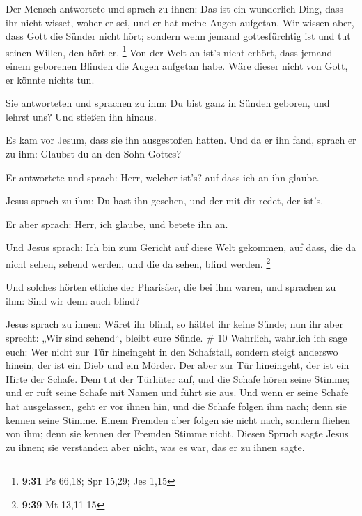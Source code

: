  Der Mensch antwortete und sprach zu ihnen: Das ist ein
wunderlich Ding, dass ihr nicht wisset, woher er sei, und er hat meine
Augen aufgetan.  Wir wissen aber, dass Gott die Sünder
nicht hört; sondern wenn jemand gottesfürchtig ist und tut seinen
Willen, den hört er. \footnote{\textbf{9:31} Ps 66,18; Spr 15,29; Jes
  1,15}  Von der Welt an ist's nicht erhört, dass jemand
einem geborenen Blinden die Augen aufgetan habe.  Wäre
dieser nicht von Gott, er könnte nichts tun.

 Sie antworteten und sprachen zu ihm: Du bist ganz in
Sünden geboren, und lehrst uns? Und stießen ihn hinaus.

 Es kam vor Jesum, dass sie ihn ausgestoßen hatten. Und
da er ihn fand, sprach er zu ihm: Glaubst du an den Sohn Gottes?

 Er antwortete und sprach: Herr, welcher ist's? auf dass
ich an ihn glaube.

 Jesus sprach zu ihm: Du hast ihn gesehen, und der mit
dir redet, der ist's.

 Er aber sprach: Herr, ich glaube, und betete ihn an.

 Und Jesus sprach: Ich bin zum Gericht auf diese Welt
gekommen, auf dass, die da nicht sehen, sehend werden, und die da sehen,
blind werden. \footnote{\textbf{9:39} Mt 13,11-15}

 Und solches hörten etliche der Pharisäer, die bei ihm
waren, und sprachen zu ihm: Sind wir denn auch blind?

 Jesus sprach zu ihnen: Wäret ihr blind, so hättet ihr
keine Sünde; nun ihr aber sprecht: „Wir sind sehend``, bleibt eure
Sünde. \# 10  Wahrlich, wahrlich ich sage euch: Wer nicht
zur Tür hineingeht in den Schafstall, sondern steigt anderswo hinein,
der ist ein Dieb und ein Mörder.  Der aber zur Tür
hineingeht, der ist ein Hirte der Schafe.  Dem tut der
Türhüter auf, und die Schafe hören seine Stimme; und er ruft seine
Schafe mit Namen und führt sie aus.  Und wenn er seine
Schafe hat ausgelassen, geht er vor ihnen hin, und die Schafe folgen ihm
nach; denn sie kennen seine Stimme.  Einem Fremden aber
folgen sie nicht nach, sondern fliehen von ihm; denn sie kennen der
Fremden Stimme nicht.  Diesen Spruch sagte Jesus zu ihnen;
sie verstanden aber nicht, was es war, das er zu ihnen sagte.

